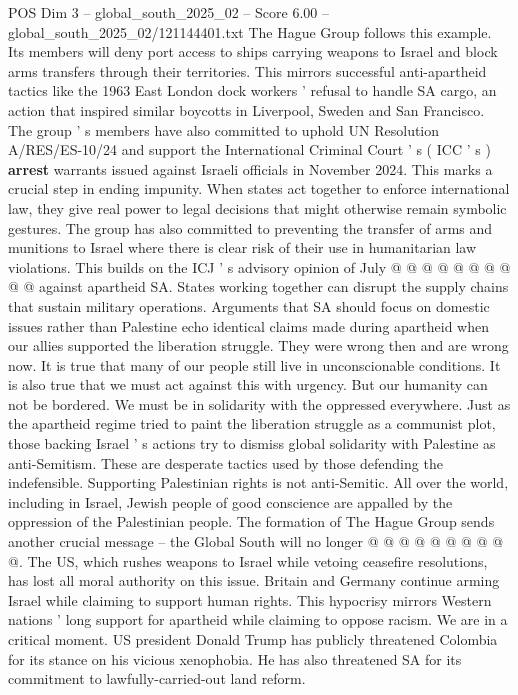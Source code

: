 \begin{textsample}{POS Dim 3 – global\_south\_2025\_02 – Score 6.00 – global\_south\_2025\_02/121144401.txt}
The Hague Group follows this example.
Its members will deny port access to ships carrying weapons to Israel and block arms transfers through their territories.
This mirrors successful anti-apartheid tactics like the 1963 East London dock workers ' refusal to handle SA cargo, an action that inspired similar boycotts in Liverpool, Sweden and San Francisco.
The group ' s members have also committed to uphold UN Resolution A/RES/ES-10/24 and support the International Criminal Court ' s ( ICC ' s ) \textbf{arrest} warrants issued against Israeli officials in November 2024.
This marks a crucial step in ending impunity.
When states act together to enforce international law, they give real power to legal decisions that might otherwise remain symbolic gestures.
The group has also committed to preventing the transfer of arms and munitions to Israel where there is clear risk of their use in humanitarian law violations.
This builds on the ICJ ' s advisory opinion of July @ @ @ @ @ @ @ @ @ @ against apartheid SA.
States working together can disrupt the supply chains that sustain military operations.
Arguments that SA should focus on domestic issues rather than Palestine echo identical claims made during apartheid when our allies supported the liberation struggle.
They were wrong then and are wrong now.
It is true that many of our people still live in unconscionable conditions.
It is also true that we must act against this with urgency.
But our humanity can not be bordered.
We must be in solidarity with the oppressed everywhere.
Just as the apartheid regime tried to paint the liberation struggle as a communist plot, those backing Israel ' s actions try to dismiss global solidarity with Palestine as anti-Semitism.
These are desperate tactics used by those defending the indefensible.
Supporting Palestinian rights is not anti-Semitic.
All over the world, including in Israel, Jewish people of good conscience are appalled by the oppression of the Palestinian people.
The formation of The Hague Group sends another crucial message -- the Global South will no longer @ @ @ @ @ @ @ @ @ @.
The US, which rushes weapons to Israel while vetoing ceasefire resolutions, has lost all moral authority on this issue.
Britain and Germany continue arming Israel while claiming to support human rights.
This hypocrisy mirrors Western nations ' long support for apartheid while claiming to oppose racism.
We are in a critical moment.
US president Donald Trump has publicly threatened Colombia for its stance on his vicious xenophobia.
He has also threatened SA for its commitment to lawfully-carried-out land reform.

\end{textsample}
